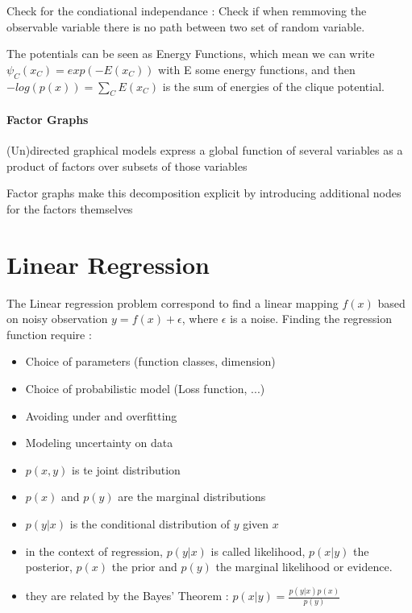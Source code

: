 				Check for the condiational independance : Check if when remmoving the observable variable there is no path between two set of random variable.

				The potentials can be seen as Energy Functions, which mean we can write $\psi_C(x_C) = exp(-E(x_C))$ with E some energy functions, and then $-log(p(x)) = \sum_C E(x_C)$ is the sum of energies of the clique potential.



			\paragraph*{Factor Graphs}

				(Un)directed graphical models express a global function of several variables as a product of factors over subsets of those variables

				Factor graphs make this decomposition explicit by introducing additional nodes for the factors themselves


\section{Linear Regression}

	The Linear regression problem correspond to find a linear mapping $f(x)$ based on noisy observation $y = f(x) + \epsilon$, where $\epsilon$ is a noise. 
	Finding the regression function require : 
	\begin{itemize}
		\item Choice of parameters (function classes, dimension)
		\item Choice of probabilistic model (Loss function, ...)
		\item Avoiding under and overfitting
		\item Modeling uncertainty on data
	\end{itemize}

	\begin{definition}
			\begin{itemize}
				\item $p(x, y)$ is te joint distribution
				\item $p(x)$ and $p(y)$ are the marginal distributions
				\item $p(y|x)$ is the conditional distribution of $y$ given $x$
			 	\item in the context of regression, $p(y|x)$ is called likelihood, $p(x|y)$ the posterior, $p(x)$ the prior and $p(y)$ the marginal likelihood or evidence.
			 	\item they are related by the Bayes' Theorem : $p(x|y) = \frac{p(y|x)p(x)}{p(y)}$ 
			\end{itemize}
		\end{definition}

